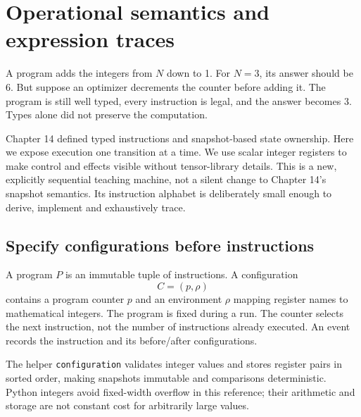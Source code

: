 \chapter{Operational semantics and expression traces}
A program adds the integers from $N$ down to 1. For $N=3$, its answer should
be 6. But suppose an optimizer decrements the counter before adding it.
The program is still well typed, every instruction is legal, and the answer
becomes 3. Types alone did not preserve the computation.

Chapter 14 defined typed instructions and snapshot-based state ownership.
Here we expose execution one transition at a time. We use scalar integer
registers to make control and effects visible without tensor-library details.
This is a new, explicitly sequential teaching machine, not a silent change
to Chapter 14's snapshot semantics. Its instruction alphabet is deliberately
small enough to derive, implement and exhaustively trace.

\section{Specify configurations before instructions}
A program $P$ is an immutable tuple of instructions. A configuration
\begin{equation}
 C=(p,\rho)
\end{equation}
contains a program counter $p$ and an environment $\rho$ mapping register names
to mathematical integers. The program is fixed during a run. The counter
selects the next instruction, not the number of instructions already executed.
An event records the instruction and its before/after configurations.

The helper \texttt{configuration} validates integer values and stores register
pairs in sorted order, making snapshots immutable and comparisons deterministic.
Python integers avoid fixed-width overflow in this reference; their arithmetic
and storage are not constant cost for arbitrarily large values.

